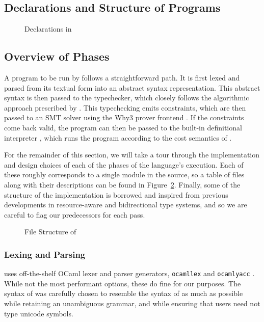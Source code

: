 \subsection{Declarations and Structure of \lambdaamorimpl Programs}
 \begin{figure}

\caption{Declarations in \lambdaamorimpl}
\label{fig:lambdaamorimmpl-decls}
\end{figure}

\subsection{Overview of Phases}

A program to be run by \lambdaamorimpl follows a straightforward path. It is first lexed and parsed from its textual form into an abstract syntax representation. This abstract syntax is then passed to the typechecker, which closely follows the algorithmic approach prescribed by \bilambdaamor. This typechecking emits constraints, which are then passed to an SMT solver using the Why3 prover frontend \citehere. If the constraints come back valid, the program can then be passed to the built-in definitional interpreter \citehere, which runs the program according to the cost semantics of \citehere.

For the remainder of this section, we will take a tour through the implementation and design choices of each of the phases of the language's execution. Each of these roughly corresponds to a single module in the \lambdaamorimpl source, so a table of files along with their descriptions can be found in Figure~\ref{fig:lambdaamorimpl-file-structure}. Finally, some of the structure of the implementation is borrowed and inspired from previous developments in resource-aware and bidirectional type systems, and so we are careful to flag our predecessors for each pass.

\begin{figure}

\caption{File Structure of \lambdaamorimpl}
\label{fig:lambdaamorimpl-file-structure}
\end{figure}


\subsubsection{Lexing and Parsing}
\lambdaamorimpl uses off-the-shelf OCaml lexer and parser generators, \texttt{ocamllex} and \texttt{ocamlyacc} \citehere. While not the most performant options, these do fine for our purposes. The syntax of \lambdaamorimpl was carefully chosen to resemble the syntax of \bilambdaamor as much as possible while retaining an unambiguous grammar, and while ensuring that users need not type unicode symbols.


